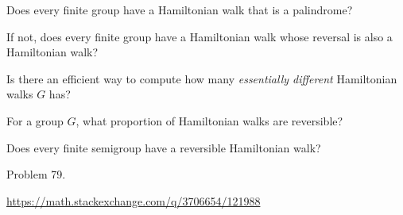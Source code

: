 \documentclass{article}
\begin{document}
\begin{question}
  Does every finite group have a Hamiltonian walk that is a palindrome?
\end{question}

\begin{related}
  \item If not, does every finite group have a Hamiltonian walk whose reversal is
    also a Hamiltonian walk?
  \item Is there an efficient way to compute how many
    \textit{essentially different} Hamiltonian walks $G$ has?
  \item For a group $G$, what proportion of Hamiltonian walks are reversible?
  \item Does every finite semigroup have a reversible Hamiltonian walk?
\end{related}

\begin{references}
  \item Problem 79.
  \item \url{https://math.stackexchange.com/q/3706654/121988}
\end{references}
\end{document}
